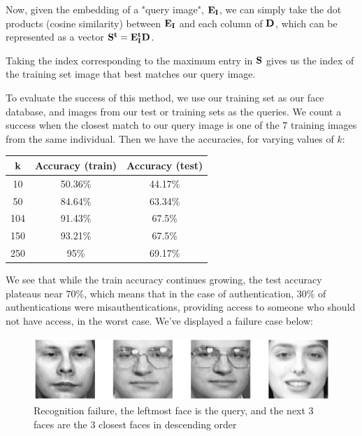 \documentclass[article]{article}
\begin{document}
Now, given the embedding of a "query image", $\bf E_I$, we can simply take the dot products (cosine similarity) between $\bf E_I$ and each column of $\bf D$, which can be represented as a vector $\bf S^t = E_I^t D$.\bigskip

Taking the index corresponding to the maximum entry in $\bf S$ gives us the index of the training set image that best matches our query image.\bigskip

To evaluate the success of this method, we use our training set as our face database, and images from our test or training sets as the queries. We count a success when the closest match to our query image is one of the $7$ training images from the same individual. Then we have the accuracies, for varying values of $k$:

\begin{center}
    \begin{tabular}{|c|c|c|}
        \hline $\bf k$ & Accuracy (train) & Accuracy (test)  \\
        \hline 10 & 50.36\% & 44.17\% \\
        \hline 50 & 84.64\% & 63.34\% \\
        \hline 104 & 91.43\% & 67.5\% \\
        \hline 150 & 93.21\% & 67.5\% \\
        \hline 250 & 95\% & 69.17\%\\
        \hline
    \end{tabular}
\end{center}

We see that while the train accuracy continues growing, the test accuracy plateaus near $70\%$, which means that in the case of authentication, $30\%$ of authentications were misauthentications, providing access to someone who should not have access, in the worst case. We've displayed a failure case below:

\begin{figure}[H]
    \centering
    \includegraphics[width=1\linewidth]{eigenfaces-recognition-failure.png}
    \caption{\centering Recognition failure, the leftmost face is the query, and the next $3$ faces are the $3$ closest faces in descending order}
    \label{fig:eigenfaces-failure}
\end{figure}
\end{document}
